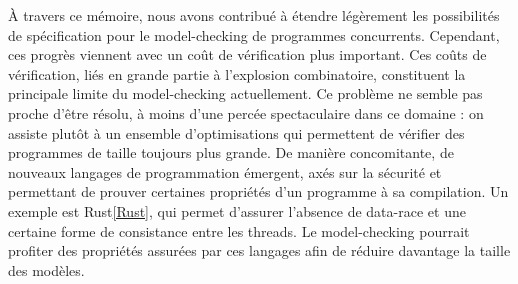 À travers ce mémoire, nous avons contribué à étendre légèrement les possibilités
de spécification pour le model-checking de programmes concurrents. Cependant,
ces progrès viennent avec un coût de vérification plus important. Ces coûts de
vérification, liés en grande partie à l'explosion combinatoire, constituent la
principale limite du model-checking actuellement. Ce problème ne semble pas
proche d'être résolu, à moins d'une percée spectaculaire dans ce domaine : on
assiste plutôt à un ensemble d'optimisations qui permettent de vérifier des
programmes de taille toujours plus grande. De manière concomitante, de nouveaux
langages de programmation émergent, axés sur la sécurité et permettant de
prouver certaines propriétés d'un programme à sa compilation. Un exemple est
Rust\ref{Rust}, qui permet d'assurer l'absence de data-race et une certaine
forme de consistance entre les threads. Le model-checking pourrait profiter des
propriétés assurées par ces langages afin de réduire davantage la taille des
modèles.